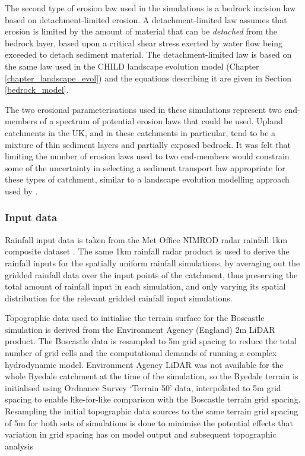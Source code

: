 The second type of erosion law used in the simulations is a bedrock incision law based on detachment-limited erosion. A detachment-limited law assumes that erosion is limited by the amount of material that can be \textit{detached} from the bedrock layer, based upon a critical shear stress exerted by water flow being exceeded to detach sediment material. The detachment-limited law is based on the same law used in the CHILD landscape evolution model (Chapter \ref{chapter_landscape_evol}) and the equations describing it are given in Section \ref{bedrock_model}.

The two erosional parameterisations used in these simulations represent two end-members of a spectrum of potential erosion laws that could be used. Upland catchments in the UK, and in these catchments in particular, tend to be a mixture of thin sediment layers and partially exposed bedrock. It was felt that limiting the number of erosion laws used to two end-members would constrain some of the uncertainty in selecting a sediment transport law appropriate for these types of catchment, similar to a landscape evolution modelling approach used by \citet{Attal2008}.
%

\subsubsection{Input data}
Rainfall input data is taken from the Met Office NIMROD radar rainfall 1km composite dataset \citep{metoffice2003nimrod}. The same 1km rainfall radar product is used to derive the rainfall inputs for the spatially uniform rainfall simulations, by averaging out the gridded rainfall data over the input points of the catchment, thus preserving the total amount of rainfall input in each simulation, and only varying its spatial distribution for the relevant gridded rainfall input simulations.

Topographic data used to initialise the terrain surface for the Boscastle simulation is derived from the Environment Agency (England) 2m LiDAR product. The Boscastle data is resampled to 5m grid spacing to reduce the total number of grid cells and the  computational demands of running a complex hydrodynamic model. Environment Agency LiDAR was not available for the whole Ryedale catchment at the time of the simulation, so the Ryedale terrain is initialised using Ordnance Survey `Terrain 50' data, interpolated to 5m grid spacing to enable like-for-like comparison with the Boscastle terrain grid spacing. Resampling the initial topographic data sources to the same terrain grid spacing of 5m for both sets of simulations is done to minimise the potential effects that variation in grid spacing has on model output and subsequent topographic analysis \citep[e.g][]{chang1991effect,schoorl2000three,haile2005effects,zhang2008effects}

